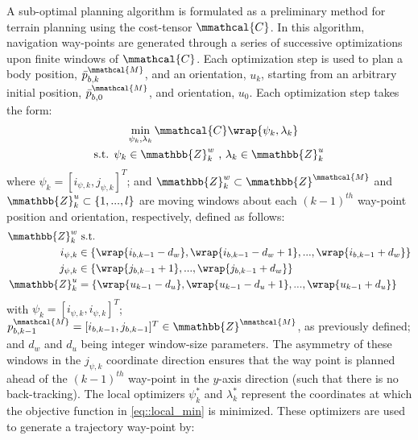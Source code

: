 			A sub-optimal planning algorithm is formulated as a preliminary method for terrain planning using the cost-tensor $\mmathcal{C}$. In this algorithm, navigation way-points are generated through a series of successive optimizations upon finite windows of  $\mmathcal{C}$. Each optimization step is used to plan a body position, $\bar{p}^{\mmathcal{M}}_{b,k}$, and an orientation, $u_{k}$, starting from an arbitrary initial position, $\bar{p}^{\mmathcal{M}}_{b,0}$, and orientation, $u_{0}$. Each optimization step takes the form:
				\begin{equation}
					\begin{split}
							&	\min_{\psi_{k},\lambda_{k}}\mmathcal{C}\wrap{\psi_{k},\lambda_{k}} 	\\
					\text{s.t. }\psi_{k}&\in\mmathbb{Z}^{w}_{k}\text{ , }\lambda_{k}\in\mmathbb{Z}^{u}_{k}
					\end{split}
					\label{eq::local_min}
				\end{equation}
			where $\psi_{k}=[i_{\psi,k},j_{\psi,k}]^{T}$; and $\mmathbb{Z}^{w}_{k}\subset\mmathbb{Z}^{\mmathcal{M}}$ and $\mmathbb{Z}^{u}_{k}\subset \{ 1,...,l \}$ are moving windows about each $(k-1)^{th}$ way-point position and orientation, respectively, defined as follows:
				\begin{equation}
					\begin{split}
						\mmathbb{Z}^{w}_{k} & \text{ s.t.}  \\
						\text{   } i_{\psi,k} 	& \in \{ \wrap{i_{b,k-1}-d_{w}},\wrap{i_{b,k-1}-d_{w}+1},...,\wrap{i_{b,k-1}+d_{w}} \} 	\\
						\text{   } j_{\psi,k} 	& \in \{ \wrap{j_{b,k-1}+1},...,\wrap{j_{b,k-1}+d_{w}} \} 	\\
						\mmathbb{Z}^{u}_{k}	&=   \{ \wrap{u_{k-1}-d_{u}}, \wrap{u_{k-1}-d_{u}+1}, ... , \wrap{u_{k-1}+d_{u}} \}
					\end{split}
					\label{eq::windows}
				\end{equation}			
			with $\psi_{k} = [i_{\psi,k},i_{\psi,k}]^{T}$; $p_{b,k-1}^{\mmathcal{M}} = [i_{b,k-1},j_{b,k-1}]^{T} \in \mmathbb{Z}^{\mmathcal{M}}$, as previously defined; and $d_{w}$ and $d_{u}$ being integer window-size parameters. The asymmetry of these windows in the $j_{\psi,k}$ coordinate direction ensures that the \Kth way point is planned ahead of the $(k-1)^{th}$ way-point in the $y$-axis direction (\IE such that there is no back-tracking). The local optimizers $\psi_{k}^{*}$ and $\lambda_{k}^{*}$ represent the coordinates at which the objective function in \ref{eq::local_min} is minimized. These optimizers are used to generate a \Kth trajectory way-point by:
